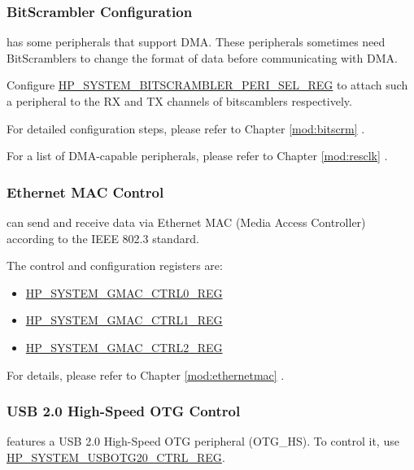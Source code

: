 \documentclass[main\_\_EN.tex]{subfiles}
\begin{document}
\subsubsection{BitScrambler Configuration}

\chipname{} has some peripherals that support DMA. These peripherals sometimes need BitScramblers to change the format of data before communicating with DMA.

Configure \hyperref[regdesc:HPSYSTEMBITSCRAMBLERPERISELREG]{HP\_SYSTEM\_BITSCRAMBLER\_PERI\_SEL\_REG} to attach such a peripheral to the RX and TX channels of bitscamblers respectively.

For detailed configuration steps, please refer to Chapter \ref{mod:bitscrm} \textit{}.

For a list of DMA-capable peripherals, please refer to Chapter \ref{mod:resclk} \textit{}.

\subsubsection{Ethernet MAC Control}

\chipname{} can send and receive data via Ethernet MAC (Media Access Controller) according to the IEEE 802.3 standard.

The control and configuration registers are:

\begin{itemize}
    \item \hyperref[regdesc:HPSYSTEMGMACCTRL0REG]{HP\_SYSTEM\_GMAC\_CTRL0\_REG}
    \item \hyperref[regdesc:HPSYSTEMGMACCTRL1REG]{HP\_SYSTEM\_GMAC\_CTRL1\_REG}
    \item \hyperref[regdesc:HPSYSTEMGMACCTRL2REG]{HP\_SYSTEM\_GMAC\_CTRL2\_REG}
\end{itemize}

For details, please refer to Chapter \ref{mod:ethernetmac} \textit{}.

\subsubsection{USB 2.0 High-Speed OTG Control}

\chipname{} features a USB 2.0 High-Speed OTG peripheral (OTG\_HS). To control it, use \hyperref[regdesc:HPSYSTEMUSBOTG20CTRLREG]{HP\_SYSTEM\_USBOTG20\_CTRL\_REG}.

\end{document}
